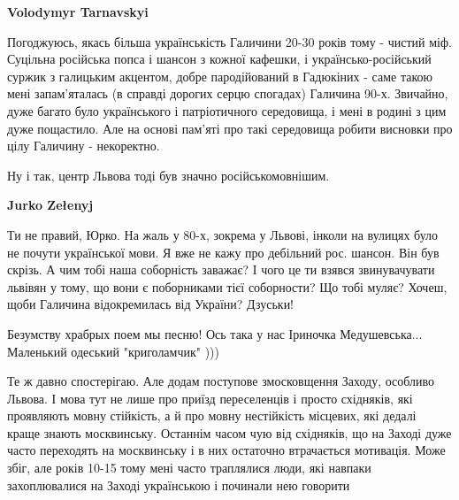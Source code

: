 \begin{itemize}
\begin{itemize}
 
\textbf{Volodymyr Tarnavskyi} 

Погоджуюсь, якась більша українськість Галичини 20-30 років тому - чистий міф.
Суцільна російська попса і шансон з кожної кафешки, і українсько-російський
суржик з галицьким акцентом, добре пародійований в Гадюкіних - саме такою мені
запам'яталась (в справді дорогих серцю спогадах) Галичина 90-х. Звичайно, дуже
багато було українського і патріотичного середовища, і мені в родині з цим дуже
пощастило. Але на основі пам'яті про такі середовища робити висновки про цілу
Галичину - некоректно.

Ну і так, центр Львова тоді був значно російськомовнішим.


 
\textbf{Jurko Zełenyj} 

Ти не правий, Юрко. На жаль у 80-х, зокрема у Львові, інколи на вулицях було не
почути української мови. Я вже не кажу про дебільний рос. шансон. Він був
скрізь. А чим тобі наша соборність заважає? І чого це ти взявся звинувачувати
львівян у тому, що вони є поборниками тієї соборности? Що тобі муляє? Хочеш,
щоби Галичина відокремилась від України? Дзуськи!
\end{itemize}

 
Безумству храбрых поем мы песню! Ось така у нас Іриночка Медушевська... Маленький одеський "криголамчик" )))

 

Те ж давно спостерігаю. Але додам поступове змосковщення Заходу, особливо
Львова. І мова тут не лише про приїзд переселенців і просто східняків, які
проявляють мовну стійкість, а й про мовну нестійкість місцевих, які дедалі
краще знають москвинську. Останнім часом чую від східняків, що на Заході дуже
часто переходять на москвинську і в них остаточно втрачається мотивація. Може
збіг, але років 10-15 тому мені часто траплялися люди, які навпаки
захоплювалися на Заході українською і починали нею говорити


\end{itemize}
